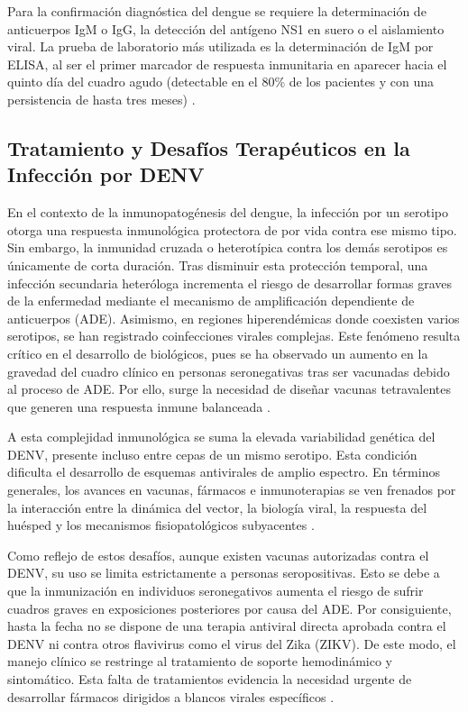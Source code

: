 Para la confirmación diagnóstica del dengue se requiere la determinación de anticuerpos IgM o IgG, la detección del antígeno NS1 en suero o el aislamiento viral. La prueba de laboratorio más utilizada es la determinación de IgM por ELISA, al ser el primer marcador de respuesta inmunitaria en aparecer hacia el quinto día del cuadro agudo (detectable en el 80\% de los pacientes y con una persistencia de hasta tres meses) \cite{fajardo2012dengue}. 

\subsection{Tratamiento y Desafíos Terapéuticos en la Infección por DENV}

En el contexto de la inmunopatogénesis del dengue, la infección por un serotipo otorga una respuesta inmunológica protectora de por vida contra ese mismo tipo. Sin embargo, la inmunidad cruzada o heterotípica contra los demás serotipos es únicamente de corta duración. Tras disminuir esta protección temporal, una infección secundaria heteróloga incrementa el riesgo de desarrollar formas graves de la enfermedad mediante el mecanismo de amplificación dependiente de anticuerpos (ADE). Asimismo, en regiones hiperendémicas donde coexisten varios serotipos, se han registrado coinfecciones virales complejas. Este fenómeno resulta crítico en el desarrollo de biológicos, pues se ha observado un aumento en la gravedad del cuadro clínico en personas seronegativas tras ser vacunadas debido al proceso de ADE. Por ello, surge la necesidad de diseñar vacunas tetravalentes que generen una respuesta inmune balanceada \cite{aynekulu2024role}.

A esta complejidad inmunológica se suma la elevada variabilidad genética del DENV, presente incluso entre cepas de un mismo serotipo. Esta condición dificulta el desarrollo de esquemas antivirales de amplio espectro. En términos generales, los avances en vacunas, fármacos e inmunoterapias se ven frenados por la interacción entre la dinámica del vector, la biología viral, la respuesta del huésped y los mecanismos fisiopatológicos subyacentes \cite{cavina2024orthoflaviviral}.

Como reflejo de estos desafíos, aunque existen vacunas autorizadas contra el DENV, su uso se limita estrictamente a personas seropositivas. Esto se debe a que la inmunización en individuos seronegativos aumenta el riesgo de sufrir cuadros graves en exposiciones posteriores por causa del ADE. Por consiguiente, hasta la fecha no se dispone de una terapia antiviral directa aprobada contra el DENV ni contra otros flavivirus como el virus del Zika (ZIKV). De este modo, el manejo clínico se restringe al tratamiento de soporte hemodinámico y sintomático. Esta falta de tratamientos evidencia la necesidad urgente de desarrollar fármacos dirigidos a blancos virales específicos \cite{maus2021sar}.

